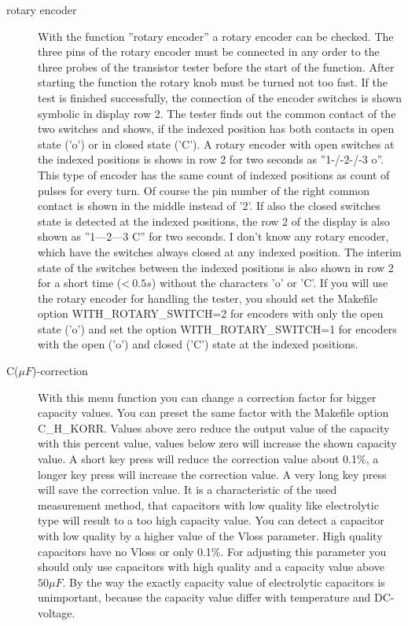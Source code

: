 \begin{description}
\item[rotary encoder]
With the function ''rotary encoder'' a rotary encoder can be checked.
The three pins of the rotary encoder must be connected in any order to the three probes of the transistor tester 
before the start of the function. 
After starting the function the rotary knob must be turned not too fast.
If the test is finished successfully, the connection of the encoder switches  is shown symbolic in display row 2.
The tester finds out the common contact of the two switches and shows, if the indexed position has
both contacts in open state ('o') or in closed state ('C').
A rotary encoder with open switches at the indexed positions is shows in row 2 for two seconds as ''1-/-2-/-3 o''.
This type of encoder has the same count of indexed positions as count of pulses for every turn. 
Of course the pin number of the right common contact is shown in the middle instead of '2'.
If also the closed switches state is detected at the indexed positions, the row 2 of the display is also
shown as ''1---2---3 C'' for two seconds.
I don't know any rotary encoder, which have the switches always closed at any indexed position.
The interim state of the switches between the indexed positions is also shown in row 2 for a short time (\textless\(~0.5s\))
without the characters 'o' or 'C'.
If you will use the rotary encoder for handling the tester, you should set the Makefile option WITH\_ROTARY\_SWITCH=2
for encoders with only the open state ('o') and set the option WITH\_ROTARY\_SWITCH=1 for encoders 
with the open ('o') and closed ('C') state at the indexed positions.\\

\item[C(\(\mu F\))-correction]
With this menu function you can change a correction factor for bigger capacity values.
You can preset the same factor with the Makefile option C\_H\_KORR.
Values above zero reduce the output value of the capacity with this percent value, values below zero will increase
the shown capacity value. A short key press will reduce the correction value about 0.1\%, a longer key press will
increase the correction value. A very long key press will save the correction value.
It is a characteristic of the used measurement method, that capacitors with low quality like electrolytic type will
result to a too high capacity value. You can detect a capacitor with low quality by a higher value of the Vloss parameter.
High quality capacitors have no Vloss or only 0.1\%.
For adjusting this parameter you should only use capacitors with high quality and a capacity value above \(50\mu F\).
By the way the exactly capacity value of electrolytic capacitors is unimportant, because the capacity value differ
with temperature and DC-voltage.


\end{description}
